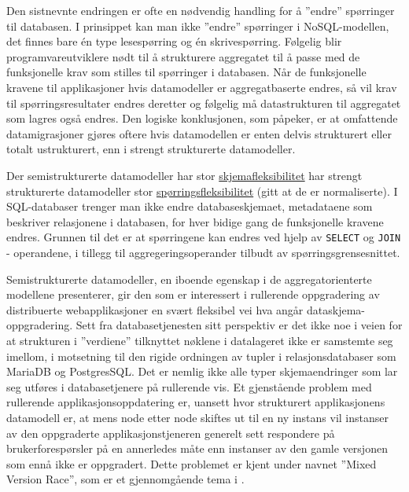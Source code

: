 Den sistnevnte endringen er ofte en nødvendig handling for å ''endre'' spørringer til databasen. I prinsippet kan man ikke ''endre'' spørringer i NoSQL-modellen, det finnes bare én type lesespørring og én skrivespørring. Følgelig blir programvareutviklere nødt til å strukturere aggregatet til å passe med de funksjonelle krav som stilles til spørringer i databasen. Når de funksjonelle kravene til applikasjoner hvis datamodeller er aggregatbaserte endres, så vil krav til spørringsresultater endres deretter og følgelig må datastrukturen til aggregatet som lagres også endres. Den logiske konklusjonen, som \cite{hauer2015} påpeker, er at omfattende datamigrasjoner gjøres oftere hvis datamodellen er enten delvis strukturert eller totalt ustrukturert, enn i strengt strukturerte datamodeller.

Der semistrukturerte datamodeller har stor \underline{skjemafleksibilitet} har strengt strukturerte datamodeller stor \underline{spørringsfleksibilitet} (gitt at de er normaliserte). I SQL-databaser trenger man ikke endre databaseskjemaet, metadataene som beskriver relasjonene i databasen, for hver bidige gang de funksjonelle kravene endres. Grunnen til det er at spørringene kan endres ved hjelp av \texttt{SELECT} og \texttt{JOIN} - operandene, i tillegg til aggregeringsoperander tilbudt av spørringsgrensesnittet.

Semistrukturerte datamodeller, en iboende egenskap i de aggregatorienterte modellene \cite{sadalage2013} presenterer, gir den som er interessert i rullerende oppgradering av distribuerte webapplikasjoner en svært fleksibel vei hva angår dataskjema-oppgradering. Sett fra databasetjenesten sitt perspektiv er det ikke noe i veien for at strukturen i ''verdiene'' tilknyttet nøklene i datalageret ikke er samstemte seg imellom, i motsetning til den rigide ordningen av tupler i relasjonsdatabaser som MariaDB og PostgresSQL. Det er nemlig ikke alle typer skjemaendringer som lar seg utføres i databasetjenere på rullerende vis. Et gjenstående problem med rullerende applikasjonsoppdatering er, uansett hvor strukturert applikasjonens datamodell er, at mens node etter node skiftes ut til en ny instans vil instanser av den oppgraderte applikasjonstjeneren generelt sett respondere på brukerforespørsler på en annerledes måte enn instanser av den gamle versjonen som ennå ikke er oppgradert. Dette problemet er kjent under navnet ''Mixed Version Race'', som er et gjennomgående tema i \cite{dumitras2010upgrade,dumitracs2009upgrades}.

